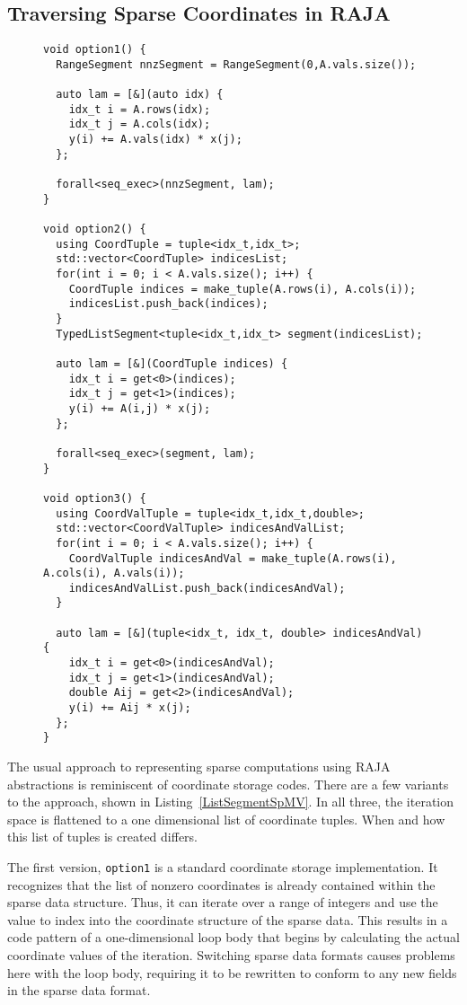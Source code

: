 \subsection{Traversing Sparse Coordinates in RAJA}
\begin{figure}
\begin{lstlisting}[caption={Using standard RAJA to write sparse matrix vector multiplication for coordinate stored data.},label=ListSegmentSpMV]
void option1() {
  RangeSegment nnzSegment = RangeSegment(0,A.vals.size());

  auto lam = [&](auto idx) {
    idx_t i = A.rows(idx);
    idx_t j = A.cols(idx);
    y(i) += A.vals(idx) * x(j);
  };

  forall<seq_exec>(nnzSegment, lam);
}

void option2() {
  using CoordTuple = tuple<idx_t,idx_t>;
  std::vector<CoordTuple> indicesList;
  for(int i = 0; i < A.vals.size(); i++) {
    CoordTuple indices = make_tuple(A.rows(i), A.cols(i));
    indicesList.push_back(indices);
  }
  TypedListSegment<tuple<idx_t,idx_t> segment(indicesList);

  auto lam = [&](CoordTuple indices) {
    idx_t i = get<0>(indices);
    idx_t j = get<1>(indices);
    y(i) += A(i,j) * x(j);
  };

  forall<seq_exec>(segment, lam);
}

void option3() {
  using CoordValTuple = tuple<idx_t,idx_t,double>;
  std::vector<CoordValTuple> indicesAndValList;
  for(int i = 0; i < A.vals.size(); i++) {
    CoordValTuple indicesAndVal = make_tuple(A.rows(i), A.cols(i), A.vals(i));
    indicesAndValList.push_back(indicesAndVal);
  }

  auto lam = [&](tuple<idx_t, idx_t, double> indicesAndVal) {
    idx_t i = get<0>(indicesAndVal);
    idx_t j = get<1>(indicesAndVal);
    double Aij = get<2>(indicesAndVal);
    y(i) += Aij * x(j);
  };
}
\end{lstlisting}
\end{figure}
The usual approach to representing sparse computations using RAJA abstractions is reminiscent of coordinate storage codes.
There are a few variants to the approach, shown in Listing~\ref{ListSegmentSpMV}.
In all three, the iteration space is flattened to a one dimensional list of coordinate tuples.
When and how this list of tuples is created differs.

The first version, \verb.option1. is a standard coordinate storage implementation.
It recognizes that the list of nonzero coordinates is already contained within the sparse data structure.
Thus, it can iterate over a range of integers and use the value to index into the coordinate structure of the sparse data.
This results in a code pattern of a one-dimensional loop body that begins by calculating the actual coordinate values of the iteration.
Switching sparse data formats causes problems here with the loop body, requiring it to be rewritten to conform to any new fields in the sparse data format.

